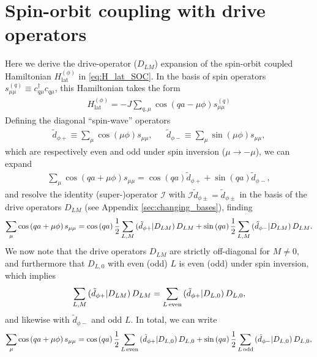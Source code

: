 \documentclass[nofootinbib,notitlepage,11pt]{revtex4-2}
\renewcommand{\t}{\text} %
\newcommand{\f}[2]{\dfrac{#1}{#2}} %
\newcommand{\p}[1]{\left(#1\right)} %
\newcommand{\1}{\mathds{1}}
\newcommand{\I}{\mathcal{I}}
\def\obk#1{\mathinner{({#1})}}
\begin{document}
\section{Spin-orbit coupling with drive operators}
\label{sec:lat_drive}

Here we derive the drive-operator ($D_{LM}$) expansion of the
spin-orbit coupled Hamiltonian $H_{\t{lat}}^{(\phi)}$ in
\eqref{eq:H_lat_SOC}.  In the basis of spin operators
$s_{\mu\mu}^{(q)} \equiv c_{q\mu}^\dag c_{q\mu}$, this Hamiltonian
takes the form
\begin{align}
  H_{\t{lat}}^{(\phi)}
  = -J \sum_{q,\mu} \cos\p{qa-\mu\phi} s_{\mu\mu}^{(q)}
  \label{eq:H_lat_spin}
\end{align}
Defining the diagonal ``spin-wave'' operators
\begin{align}
  \tilde d_{\phi+} \equiv \sum_\mu \cos\p{\mu\phi} s_{\mu\mu},
  &&
  \tilde d_{\phi-} \equiv \sum_\mu \sin\p{\mu\phi} s_{\mu\mu},
\end{align}
which are respectively even and odd under spin inversion
($\mu\to-\mu$), we can expand
\begin{align}
  \sum_\mu \cos\p{qa+\mu\phi} s_{\mu\mu}
  = \cos\p{qa} \tilde d_{\phi+} + \sin\p{qa} \tilde d_{\phi-},
\end{align}
and resolve the identity (super-)operator $\I$ with
$\I \tilde d_{\phi\pm} = \tilde d_{\phi\pm}$ in the basis of the drive operators
$D_{LM}$ (see Appendix \ref{sec:changing_bases}), finding
\begin{align}
  \sum_\mu \cos\p{qa+\mu\phi} s_{\mu\mu}
  = \cos\p{qa} \f12 \sum_{L,M} \obk{\tilde d_{\phi+}|D_{LM}} D_{LM}
  + \sin\p{qa} \f12 \sum_{L,M} \obk{\tilde d_{\phi-}|D_{LM}} D_{LM}.
\end{align}
We now note that the drive operators $D_{LM}$ are strictly
off-diagonal for $M\ne0$, and furthermore that $D_{L,0}$ with even
(odd) $L$ is even (odd) under spin inversion, which implies
\begin{align}
  \sum_{L,M} \obk{\tilde d_{\phi+}|D_{LM}} D_{LM}
  = \sum_{L\,\t{even}} \obk{\tilde d_{\phi+}|D_{L,0}} D_{L,0},
\end{align}
and likewise with $\tilde d_{\phi-}$ and odd $L$.  In total, we can
write
\begin{align}
  \sum_\mu \cos\p{qa+\mu\phi} s_{\mu\mu}
  = \cos\p{qa} \f12 \sum_{L\,\t{even}}
  \obk{\tilde d_{\phi+}|D_{L,0}} D_{L,0}
  + \sin\p{qa} \f12 \sum_{L\,\t{odd}}
  \obk{\tilde d_{\phi-}|D_{L,0}} D_{L,0},
\end{align}
\end{document}
